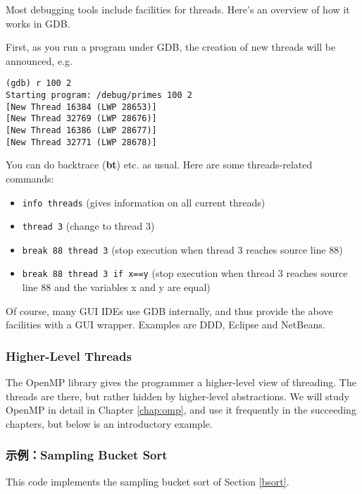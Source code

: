Most debugging tools include facilities for threads.  Here's an overview
of how it works in GDB.

First, as you run a program under GDB, the creation of new threads will
be announced, e.g.

\begin{Verbatim}
(gdb) r 100 2
Starting program: /debug/primes 100 2
[New Thread 16384 (LWP 28653)]
[New Thread 32769 (LWP 28676)]
[New Thread 16386 (LWP 28677)]
[New Thread 32771 (LWP 28678)]
\end{Verbatim}

You can do backtrace ({\bf bt}) etc. as usual.  Here are some
threads-related commands:

\begin{itemize}

\item {\tt info threads} (gives information on all current threads)

\item {\tt thread 3} (change to thread 3)

\item {\tt break 88 thread 3} (stop execution when thread 3 reaches
source line 88)

\item {\tt break 88 thread 3 if x==y} (stop execution when thread 3 reaches
source line 88 and the variables x and y are equal)

\end{itemize}

Of course, many GUI IDEs use GDB internally, and thus provide the above
facilities with a GUI wrapper.  Examples are DDD, Eclipse and NetBeans.

\subsubsection{Higher-Level Threads}

The OpenMP library gives the programmer a higher-level view of
threading.  The threads are there, but rather hidden by higher-level
abstractions.  We will study OpenMP in detail in Chapter \ref{chap:omp},
and use it frequently in the succeeding chapters, but below is an
introductory example.

\subsubsection{示例：Sampling Bucket Sort}
\label{ompbsort}

This code implements the sampling bucket sort of Section \ref{bsort}.

